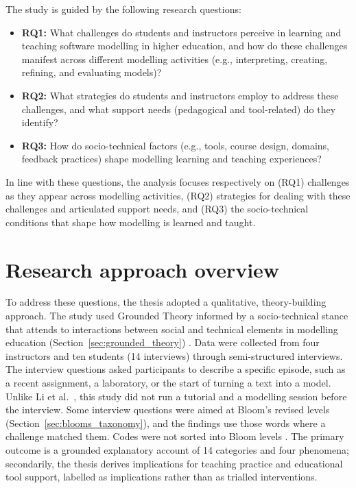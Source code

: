 The study is guided by the following research questions:

\begin{itemize}
    \item \textbf{RQ1:} What challenges do students and instructors perceive in learning and teaching software modelling in higher education, and how do these challenges manifest across different modelling activities (e.g., interpreting, creating, refining, and evaluating models)?
    \item \textbf{RQ2:} What strategies do students and instructors employ to address these challenges, and what support needs (pedagogical and tool-related) do they identify?
    \item \textbf{RQ3:} How do socio-technical factors (e.g., tools, course design, domains, feedback practices) shape modelling learning and teaching experiences?
\end{itemize}

In line with these questions, the analysis focuses respectively on (RQ1) challenges as they appear across modelling activities, (RQ2) strategies for dealing with these challenges and articulated support needs, and (RQ3) the socio-technical conditions that shape how modelling is learned and taught.

\section{Research approach overview}
\label{sec:intro_approach}

To address these questions, the thesis adopted a qualitative, theory-building approach. The study used Grounded Theory informed by a socio-technical stance that attends to interactions between social and technical elements in modelling education (Section~\ref{sec:grounded_theory}) \cite{hoda2018socio,stol2016grounded}. Data were collected from four instructors and ten students (14 interviews) through semi-structured interviews. The interview questions asked participants to describe a specific episode, such as a recent assignment, a laboratory, or the start of turning a text into a model. Unlike Li et al.\ \cite{istar-learning}, this study did not run a tutorial and a modelling session before the interview. Some interview questions were aimed at Bloom's revised levels (Section~\ref{sec:blooms_taxonomy}), and the findings use those words where a challenge matched them. Codes were not sorted into Bloom levels \cite{krathwohl2002revision}. The primary outcome is a grounded explanatory account of 14 categories and four phenomena; secondarily, the thesis derives implications for teaching practice and educational tool support, labelled as implications rather than as trialled interventions.

